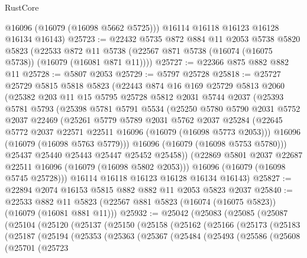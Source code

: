 \begin{lexlean}{RustCore}
\begin{coremodule}
        @16096
        (@16079 (@16098 @5662 @5725)))
      @16114
      @16118
      @16123
      @16128
      @16134
      @16143)
@25723 := @22432
    @5735
    @872
    @884
    @11
    @2053
    @5738
    @5820
    @5823
    (@22533 @872 @11 @5738 (@22567 @871 @5738 (@16074 (@16075 @5738)) (@16079 (@16081 @871 @11))))
@25727 := @22366 @875 @882 @882 @11
@25728 := @5807 @2053
@25729 := @5797 @25728
@25818 := @25727
    @25729
    @5815
    @5818
    @5823
    (@22443
      @874
      @16
      @169
      @25729
      @5813
      @2060
      (@25382
        @203
        @11
        @15
        @5795
        @25728
        @5812
        @2031
        @5744
        @2037
        (@25393
          @5781
          @5793
          (@25398
            @5781
            @5791
            @5534
            (@25250
              @5780
              @5790
              @2031
              @5752
              @2037
              @22469
              (@25261
                @5779
                @5789
                @2031
                @5762
                @2037
                @25284
                (@22645 @5772 @2037 @22571 @22511 @16096 (@16079 (@16098 @5773 @2053)))
                @16096
                (@16079 (@16098 @5763 @5779)))
              @16096
              (@16079 (@16098 @5753 @5780)))
            @25437
            @25440
            @25443
            @25447
            @25452
            @25458))
        (@22869 @5801 @2037 @22687 @22511 @16096 (@16079 (@16098 @5802 @2053)))
        @16096
        (@16079 (@16098 @5745 @25728)))
      @16114
      @16118
      @16123
      @16128
      @16134
      @16143)
@25827 := @22894 @2074 @16153 @5815 @882 @882 @11 @2053 @5823 @2037
@25840 := @22533
    @882
    @11
    @5823
    (@22567 @881 @5823 (@16074 (@16075 @5823)) (@16079 (@16081 @881 @11)))
@25932 := @25042
    (@25083
      (@25085
        (@25087
          (@25104
            (@25120
              (@25137
                (@25150
                  (@25158
                    (@25162
                      (@25166
                        (@25173
                          (@25183
                            (@25187
                              (@25194
                                (@25353
                                  (@25363
                                    (@25367
                                      (@25484
                                        (@25493
                                          (@25586
                                            (@25608
                                              (@25701
                                                (@25723

\end{coremodule}
\end{lexlean}
